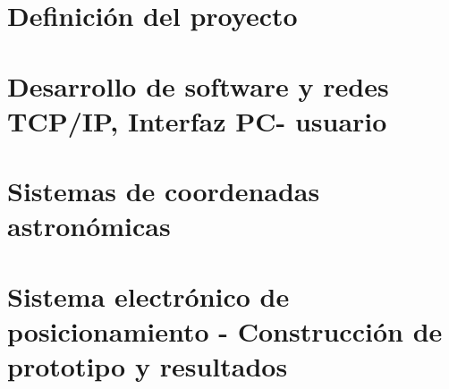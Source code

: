 \documentclass[a4paper,openany,oneside]{book}
\begin{document}
\renewcommand{\tablename}{Tabla}
\renewcommand{\contentsname}{Índice}


\frontmatter


\tableofcontents 

\mainmatter 


\part{Definición del proyecto}







\part{ Desarrollo de software y redes TCP/IP, Interfaz PC- usuario }








\part{Sistemas de coordenadas astronómicas}
%


\part{Sistema electrónico de posicionamiento - Construcción de prototipo y resultados}



\end{document}
